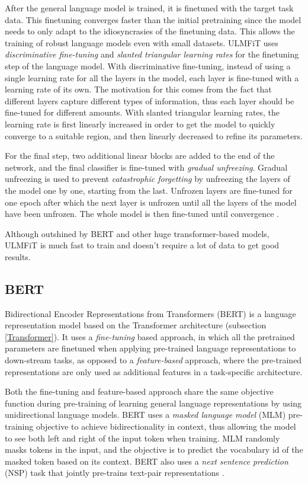After the general language model is trained, it is finetuned with the target task data.
This finetuning converges faster than the initial pretraining since the model needs to only adapt to the idiosyncrasies of the finetuning data.
This allows the training of robust language models even with small datasets.
ULMFiT uses \textit{discriminative fine-tuning} and \textit{slanted triangular learning rates} for the finetuning step of the language model.
With discriminative fine-tuning, instead of using a single learning rate for all the layers in the model, each layer is fine-tuned with a learning rate of its own.
The motivation for this comes from the fact that different layers capture different types of information, thus each layer should be fine-tuned for different amounts.
With slanted triangular learning rates, the learning rate is first linearly increased in order to get the model to quickly converge to a suitable region, and then linearly decreased to refine its parameters.

For the final step, two additional linear blocks are added to the end of the network, and the final classifier is fine-tuned with \textit{gradual unfreezing}.
Gradual unfreezing is used to prevent \textit{catastrophic forgetting} by unfreezing the layers of the model one by one, starting from the last.
Unfrozen layers are fine-tuned for one epoch after which the next layer is unfrozen until all the layers of the model have been unfrozen.
The whole model is then fine-tuned until convergence \cite{howard2018}.

Although outshined by BERT and other huge transformer-based models, ULMFiT is much fast to train and doesn't require a lot of data to get good results.




\subsection{BERT} \label{BERT}
Bidirectional Encoder Representations from Transformers (BERT) is a language representation model based on the Transformer \cite{vaswani2017} architecture (subsection \ref{Transformer}).
It uses a \textit{fine-tuning} based approach, in which all the pretrained parameters are finetuned when applying pre-trained language representations to down-stream tasks, as opposed to a \textit{feature-based} approach, where the pre-trained representations are only used as additional features in a task-specific architecture.

Both the fine-tuning and feature-based approach share the same objective function during pre-training of learning general language representations by using unidirectional language models.
BERT uses a \textit{masked language model} (MLM) pre-training objective to achieve bidirectionality in context, thus allowing the model to see both left and right of the input token when training.
MLM randomly masks tokens in the input, and the objective is to predict the vocabulary id of the masked token based on its context.
BERT also uses a \textit{next sentence prediction} (NSP) task that jointly pre-trains text-pair representations \cite{devlin2019}.

